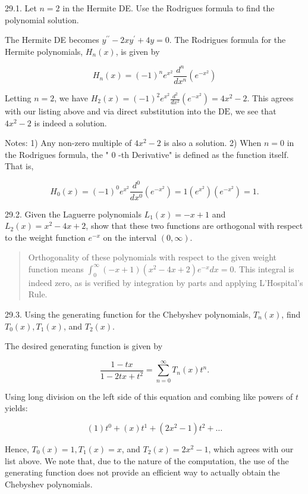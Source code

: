 \documentclass[10pt]{article}
\begin{document}
29.1. Let $n=2$ in the Hermite DE. Use the Rodrigues formula to find the polynomial solution.

The Hermite DE becomes $y^{\prime \prime}-2 x y^{\prime}+4 y=0$. The Rodrigues formula for the Hermite polynomials, $H_{n}(x)$, is given by

$$
H_{n}(x)=(-1)^{n} e^{x^{2}} \frac{d^{n}}{d x^{n}}\left(e^{-x^{2}}\right)
$$

Letting $n=2$, we have $H_{2}(x)=(-1)^{2} e^{x^{2}} \frac{d^{2}}{d x^{2}}\left(e^{-x^{2}}\right)=4 x^{2}-2$. This agrees with our listing above and via direct substitution into the $\mathrm{DE}$, we see that $4 x^{2}-2$ is indeed a solution.

Notes: 1) Any non-zero multiple of $4 x^{2}-2$ is also a solution. 2) When $n=0$ in the Rodrigues formula, the " 0 -th Derivative" is defined as the function itself. That is,

$$
H_{0}(x)=(-1)^{0} e^{x^{2}} \frac{d^{0}}{d x^{0}}\left(e^{-x^{2}}\right)=1\left(e^{x^{2}}\right)\left(e^{-x^{2}}\right)=1 .
$$

29.2. Given the Laguerre polynomials $L_{1}(x)=-x+1$ and $L_{2}(x)=x^{2}-4 x+2$, show that these two functions are orthogonal with respect to the weight function $e^{-x}$ on the interval $(0, \infty)$.

\begin{abstract}
Orthogonality of these polynomials with respect to the given weight function means $\int_{0}^{\infty}(-x+1)\left(x^{2}-4 x+2\right) e^{-x} d x=0$. This integral is indeed zero, as is verified by integration by parts and applying L'Hospital's Rule.
\end{abstract}

29.3. Using the generating function for the Chebyshev polynomials, $T_{n}(x)$, find $T_{0}(x), T_{1}(x)$, and $T_{2}(x)$.

The desired generating function is given by

$$
\frac{1-t x}{1-2 t x+t^{2}}=\sum_{n=0}^{\infty} T_{n}(x) t^{n} .
$$

Using long division on the left side of this equation and combing like powers of $t$ yields:

$$
(1) t^{0}+(x) t^{1}+\left(2 x^{2}-1\right) t^{2}+\ldots
$$

Hence, $T_{0}(x)=1, T_{1}(x)=x$, and $T_{2}(x)=2 x^{2}-1$, which agrees with our list above. We note that, due to the nature of the computation, the use of the generating function does not provide an efficient way to actually obtain the Chebyshev polynomials.
\end{document}
